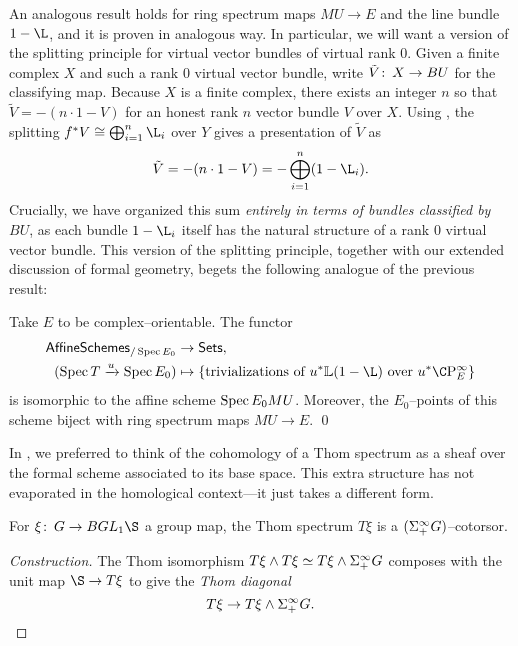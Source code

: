 An analogous result holds for ring spectrum maps $MU \to E$ and the line bundle $1 - \L$, and it is proven in analogous way.  In particular, we will want a version of the splitting principle for virtual vector bundles of virtual rank $0$.  Given a finite complex $X$ and such a rank $0$ virtual vector bundle, write $\tilde V \colon\thinspace X \to BU$ for the classifying map.  Because $X$ is a finite complex, there exists an integer $n$ so that $\tilde V = -(n \cdot 1 - V)$ for an honest rank $n$ vector bundle $V$ over $X$.  Using , the splitting $f^* V \cong \bigoplus_{i=1}^n \L_i$ over $Y$ gives a presentation of $\tilde V$ as \[\tilde V = -(n \cdot 1 - V) = -\bigoplus_{i=1}^n (1 - \L_i).\]  Crucially, we have organized this sum \emph{entirely in terms of bundles classified by $BU$}, as each bundle $1 - \L_i$ itself has the natural structure of a rank $0$ virtual vector bundle.  This version of the splitting principle, together with our extended discussion of formal geometry, begets the following analogue of the previous result:
\begin{theorem}\label{BUTriumvirate}
Take $E$ to be complex--orientable.  The functor
\begin{align*}
\CatOf{AffineSchemes}_{/\Spec E_0} & \to \CatOf{Sets}, \\
(\Spec T \xrightarrow{u} \Spec E_0) & \mapsto \left\{ \text{trivializations of $u^* \ThomSheaf{1 - \L}$ over $u^* \CP^\infty_E$} \right\}
\end{align*}
is isomorphic to the affine scheme $\operatorname{Spec} E_0 MU$.  Moreover, the $E_0$--points of this scheme biject with ring spectrum maps $MU \to E$. \qed
\end{theorem}

In , we preferred to think of the cohomology of a Thom spectrum as a sheaf over the formal scheme associated to its base space.  This extra structure has not evaporated in the homological context---it just takes a different form.
\begin{lemma}
For $\xi\co G \to BGL_1 \S$ a group map, the Thom spectrum $T\xi$ is a $(\Sigma^\infty_+ G)$--cotorsor.
\end{lemma}
\begin{proof}[Construction]
The Thom isomorphism $T\xi \wedge T\xi \simeq T\xi \wedge \Sigma^\infty_+ G$ composes with the unit map $\S \to T\xi$ to give the \textit{Thom diagonal} \[T\xi \to T\xi \wedge \Sigma^\infty_+ G. \qedhere\]
\end{proof}


